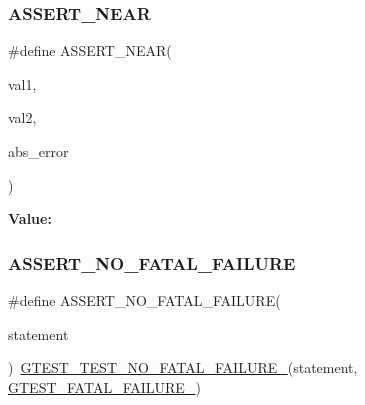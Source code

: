 \mbox{\label{googletest-master_2googletest_2include_2gtest_2gtest_8h_a73cce6b752d204f91a36bef2f8e663b3}} 
\subsubsection{\texorpdfstring{ASSERT\_NEAR}{ASSERT\_NEAR}}
{\footnotesize\ttfamily \#define A\+S\+S\+E\+R\+T\+\_\+\+N\+E\+AR(\begin{DoxyParamCaption}\item[{}]{val1,  }\item[{}]{val2,  }\item[{}]{abs\+\_\+error }\end{DoxyParamCaption})}

{\bfseries Value\+:}
\begin{DoxyCode}{0}

\end{DoxyCode}
\mbox{\label{googletest-master_2googletest_2include_2gtest_2gtest_8h_a5034fda3490aad5a93942ac83f4cea49}} 
\subsubsection{\texorpdfstring{ASSERT\_NO\_FATAL\_FAILURE}{ASSERT\_NO\_FATAL\_FAILURE}}
{\footnotesize\ttfamily \#define A\+S\+S\+E\+R\+T\+\_\+\+N\+O\+\_\+\+F\+A\+T\+A\+L\+\_\+\+F\+A\+I\+L\+U\+RE(\begin{DoxyParamCaption}\item[{}]{statement }\end{DoxyParamCaption})~\mbox{\hyperlink{_obj__test_2lib_2googletest-release-1_88_81_2googletest_2include_2gtest_2internal_2gtest-internal_8h_a1b37a3c446836d33040f3266a6236081}{G\+T\+E\+S\+T\+\_\+\+T\+E\+S\+T\+\_\+\+N\+O\+\_\+\+F\+A\+T\+A\+L\+\_\+\+F\+A\+I\+L\+U\+R\+E\+\_\+}}(statement, \mbox{\hyperlink{_obj__test_2lib_2googletest-release-1_88_81_2googletest_2include_2gtest_2internal_2gtest-internal_8h_a0f9a4c3ea82cc7bf4478eaffdc168358}{G\+T\+E\+S\+T\+\_\+\+F\+A\+T\+A\+L\+\_\+\+F\+A\+I\+L\+U\+R\+E\+\_\+}})}

